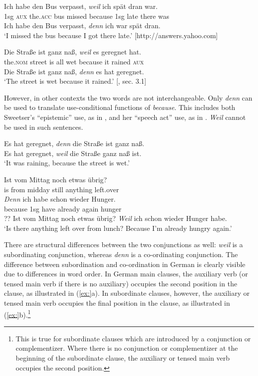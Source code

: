 \ea
\ea \gll Ich  habe  den  Bus  verpasst,  \textit{weil}  ich  spät  dran  war.\\
1sg  \textsc{aux}  the.\textsc{acc}  bus  missed  because  1sg  late  there  was\\
\ex  Ich habe den Bus verpasst, \textit{denn} ich war spät dran.\\
\glt ‘I missed the bus because I got there late.’ [http://answers.yahoo.com]
\z \z

\ea
\ea \gll  Die  Straße  ist  ganz  naß,  \textit{weil}  es  geregnet  hat.\\
the.\textsc{nom}  street  is  all  wet  because  it  rained  \textsc{aux}\\
\ex \gll Die Straße ist ganz naß, \textit{denn} es hat geregnet.\\
‘The street is wet because it rained.’  [\citealt{Scheffler2008}, sec. 3.1]\\
\z \z

However, in other contexts the two words are not interchangeable. Only \textit{denn} can be used to translate use-conditional functions of \textit{because}. This includes both Sweetser’s “epistemic” use, as in , and her “speech act” use, as in . \textit{Weil} cannot be used in such sentences.


\ea
\ea Es hat geregnet, \textit{denn} die Straße ist ganz naß.\\
\ex *Es hat geregnet, \textit{weil} die Straße ganz naß ist.\\
‘It was raining, because the street is wet.’
                       \z
\z

\ea
\ea \gll Ist  vom  Mittag  noch  etwas  übrig?\\
is  from  midday  still  anything  left.over\\
\gll \textit{Denn}  ich  habe  schon  wieder  Hunger.\\
because  1sg  have  already  again  hunger\\
\ex ?? Ist vom Mittag noch etwas übrig? \textit{Weil} ich schon wieder Hunger habe.\\
\glt ‘Is there anything left over from lunch? Because I’m already hungry again.’
\z \z


There are structural differences between the two conjunctions as well: \textit{weil} is a subordinating conjunction, whereas \textit{denn} is a co-ordinating conjunction. The difference between subordination and co-ordination in German is clearly visible due to differences in word order. In German main clauses, the auxiliary verb (or tensed main verb if there is no auxiliary) occupies the second position in the clause, as illustrated in (\ref{ex:}a). In subordinate clauses, however, the auxiliary or tensed main verb occupies the final position in the clause, as illustrated in (\ref{ex:}b).\footnote{This is true for subordinate clauses which are introduced by a conjunction or complementizer. Where there is no conjunction or complementizer at the beginning of the subordinate clause, the auxiliary or tensed main verb occupies the second position.}


